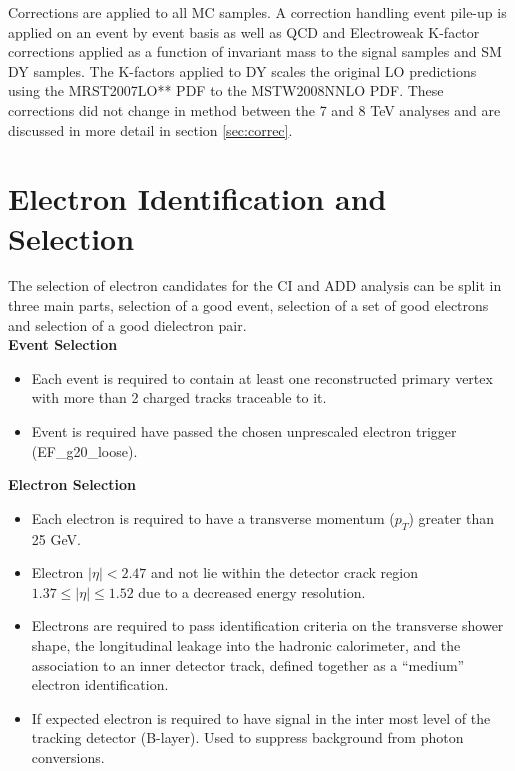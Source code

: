 	Corrections are applied to all MC samples. A correction handling event pile-up is applied on an event by event basis as well as QCD and Electroweak K-factor corrections applied as a function of invariant mass to the signal samples and SM DY samples. The K-factors applied to DY scales the original LO predictions using the MRST2007LO** \cite{Martin:2004dh} PDF to the MSTW2008NNLO \cite{Martin:2009iq} PDF. These corrections did not change in method between the 7 and 8 TeV analyses and are discussed in more detail in section \ref{sec:correc}.



\section{Electron Identification and Selection}

	The selection of electron candidates for the CI and ADD analysis can be split in three main parts, selection of a good event, selection of a set of good electrons and selection of a good dielectron pair.\\

	{\bf Event Selection}
	\begin{itemize}
	\item Each event is required to contain at least one reconstructed primary vertex with more than 2 charged tracks traceable to it.
	\item Event is required have passed the chosen unprescaled electron trigger (EF\_g20\_loose).
	\end{itemize}

	{\bf Electron Selection}
	\begin{itemize}
	\item Each electron is required to have a transverse momentum ($p_{T}$) greater than 25 GeV.
	\item Electron $|\eta| < 2.47$ and not lie within the detector crack region $1.37 \leq |\eta| \leq 1.52$ due to a decreased energy resolution.
	\item Electrons are required to pass identification criteria on the transverse shower shape, the longitudinal leakage into the hadronic calorimeter, and the association to an inner detector track, defined together as a ``medium'' electron identification.
	\item If expected electron is required to have signal in the inter most level of the tracking detector (B-layer). Used to suppress background from photon conversions.
	\end{itemize}

